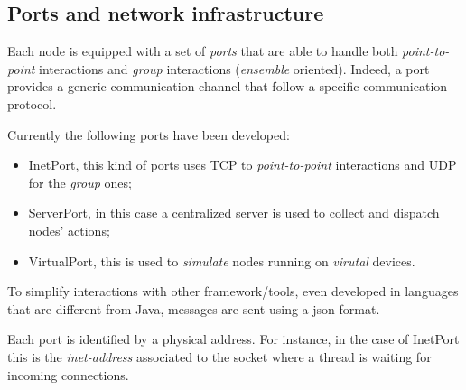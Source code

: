 \documentclass[11pt]{article}
\newcommand{\java}{\textsf{Java}}
\begin{document}
\subsection{Ports and network infrastructure}
\label{sec:ports}

Each node is equipped with a set of \emph{ports} that are 
able to handle both  \emph{point-to-point} interactions and \emph{group} interactions (\emph{ensemble} oriented).
%
Indeed, a port provides a generic communication channel that follow a specific communication protocol. 

Currently the following ports have been developed:
\begin{itemize}
\item \textsf{InetPort}, this kind of ports uses TCP to \emph{point-to-point} interactions and UDP for the \emph{group} ones;
\item \textsf{ServerPort}, in this case a centralized server is used to collect and dispatch nodes' actions;
\item \textsf{VirtualPort}, this is used to \emph{simulate} nodes running on \emph{virutal} devices.
\end{itemize} 

To simplify interactions with other framework/tools, even developed in languages that are different from
\java{}, messages are sent using a \textsf{json} format.

Each port is identified by a physical address. For instance, in the case of \textsf{InetPort} this is the 
\emph{inet-address} associated to the socket where a thread is waiting for incoming connections.

%
\end{document}
